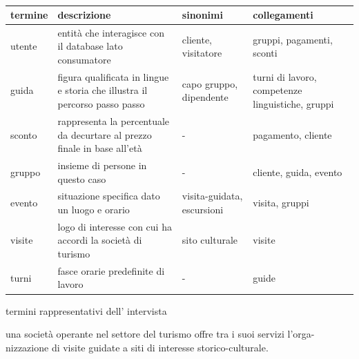 \documentclass[a4paper,12pt]{report}
\begin{document}
\begin{table}[H]
    \begin{center}
        \begin{tabularx}{\textwidth}{|>{\centering\arraybackslash}X|>{\centering\arraybackslash}X|>{\centering\arraybackslash}X|>{\centering\arraybackslash}X|}
            \hline
            \rowcolor{red} termine & descrizione & sinonimi & collegamenti \\
            \hline
            utente & entità che interagisce con il database lato consumatore & cliente, visitatore & gruppi, pagamenti, sconti \\
            \hline
            guida  & figura qualificata in lingue e storia che illustra il percorso passo passo & capo gruppo, dipendente & turni di lavoro, competenze linguistiche, gruppi \\
            \hline
            sconto & rappresenta la percentuale da decurtare al prezzo finale in base all'età & - & pagamento, cliente\\
            \hline
            gruppo & insieme di persone in questo caso & - & cliente, guida, evento \\
            \hline
            evento & situazione specifica dato un luogo e orario & visita-guidata, escursioni & visita, gruppi \\
            \hline
            visite & logo di interesse con cui ha accordi la società di turismo & sito culturale & visite \\
            \hline
            turni & fasce orarie predefinite di lavoro & - & guide\\
            \hline
        
        \end{tabularx}
        \caption{\label{glossario:termini}} termini rappresentativi dell' intervista 
    \end{center}
\end{table}


una società operante nel settore del turismo offre tra i suoi servizi l’orga-
nizzazione di visite guidate a siti di interesse storico-culturale.
\end{document}
